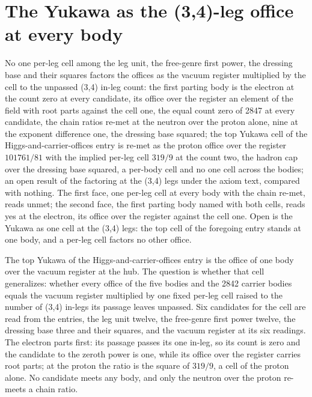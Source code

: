 \section{The Yukawa as the (3,4)-leg office at every body}\label{mod:VI-7a-D541324-w-yklo}
\begin{chwall}\label{box:VI-7a-D541324-w-yklo:1}
No one per-leg cell among the leg unit, the free-genre first power, the dressing base and their squares factors the offices as the vacuum register multiplied by the cell to the unpassed (3,4) in-leg count: the first parting body is the electron at the count zero at every candidate, its office over the register an element of the field with root parts against the cell one, the equal count zero of 2847 at every candidate, the chain ratios re-met at the neutron over the proton alone, nine at the exponent difference one, the dressing base squared; the top Yukawa cell of the Higgs-and-carrier-offices entry is re-met as the proton office over the register $101761/81$ with the implied per-leg cell $319/9$ at the count two, the hadron cap over the dressing base squared, a per-body cell and no one cell across the bodies; an open result of the factoring at the (3,4) legs under the axiom text, compared with nothing.
The first face, one per-leg cell at every body with the chain re-met, reads unmet; the second face, the first parting body named with both cells, reads yes at the electron, its office over the register against the cell one. Open is the Yukawa as one cell at the (3,4) legs: the top cell of the foregoing entry stands at one body, and a per-leg cell factors no other office.
\end{chwall}
The top Yukawa of the Higgs-and-carrier-offices entry is the office of one body over the vacuum register at the hub. The question is whether that cell generalizes: whether every office of the five bodies and the 2842 carrier bodies equals the vacuum register multiplied by one fixed per-leg cell raised to the number of (3,4) in-legs its passage leaves unpassed. Six candidates for the cell are read from the entries, the leg unit twelve, the free-genre first power twelve, the dressing base three and their squares, and the vacuum register at its six readings. The electron parts first: its passage passes its one in-leg, so its count is zero and the candidate to the zeroth power is one, while its office over the register carries root parts; at the proton the ratio is the square of $319/9$, a cell of the proton alone. No candidate meets any body, and only the neutron over the proton re-meets a chain ratio.
